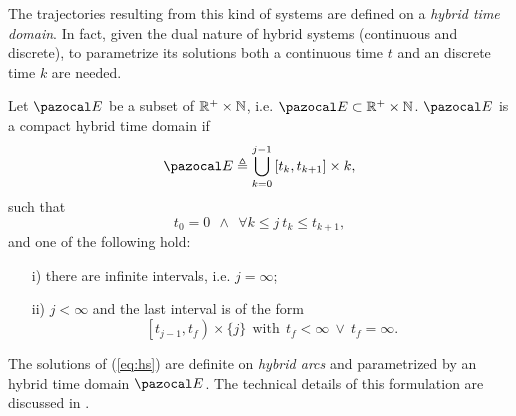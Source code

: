 %
The trajectories resulting from this kind of systems are defined on a \textit{hybrid time domain}. In fact, given the dual nature of hybrid systems (continuous and discrete), to parametrize its solutions both a continuous time $t$ and an discrete time $k$ are needed.
%
\begin{defn}
    Let $\E$ be a subset of $\mathbb{R}^+\times\mathbb{N}$, i.e. $\E\subset\R^+\times\mathbb{N}$. $\E$ is a compact hybrid time domain if 
    \begin{equation}
        \E\triangleq\bigcup_{k = 0}^{j-1}\left[t_k,t_{k+1}\right]\times {k},
    \end{equation}
    such that
    \begin{equation}
        t_0 = 0~~\land~~\forall k\leq j~t_k\leq t_{k+1},
    \end{equation}
    and one of the following hold:
    \begin{itemize}
        \item [i)] there are infinite intervals, i.e. $j = \infty$;
        \item [ii)] $j<\infty$ and the last interval is of the form
        \begin{equation}
            \left[t_{j-1},t_f\right)\times \{j\}~~\text{with}~~t_f<\infty~\lor~t_f = \infty.
        \end{equation}
    \end{itemize}
\end{defn}
%
The solutions of (\ref{eq:hs}) are definite on \textit{hybrid arcs} and parametrized by an hybrid time domain $\E$. The technical details of this formulation are discussed in \citep{Goebel2012}. 
%
